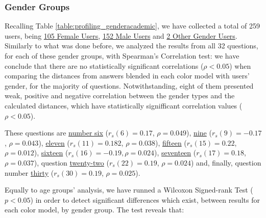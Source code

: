 \subsubsection{Gender Groups}
\label{subsubsec:demo_age}
%
Recalling Table \ref{table:profiling_genderacademic}, we have collected a total of 259 users, being \ul{105 Female Users}, \ul{152 Male Users} and \ul{2 Other Gender Users}. Similarly to what was done before, we analyzed the results from
all 32 questions, for each of these gender groups, with Spearman's Correlation test: we have conclude that there are no statistically significant correlations ($\rho < 0.05$) when comparing the distances from answers blended in each color model with users' gender, for the majority of questions.
Notwithstanding, eight of them presented weak, positive and negative correlation between the gender types and the calculated distances, which have statistically signifficant correlation values ($\rho < 0.05$). \par
%
These questions are \ul{number six} ($r_s(6) = 0.17$, $\rho = 0.049$), \ul{nine} ($r_s(9) = -0.17$, $\rho = 0.043$), \ul{eleven} ($r_s(11) = 0.182$, $\rho = 0.038$), \ul{fifteen} ($r_s(15) = 0.22$, $\rho = 0.012$), \ul{sixteen} ($r_s(16) = -0.19, \rho = 0.024$), \ul{seventeen}
($r_s(17) = 0.18$, $\rho = 0.037$), question \ul{twenty-two} ($r_s(22) = 0.19$, $\rho = 0.024$) and, finally, question number \ul{thirty} ($r_s(30) = 0.19$, $\rho = 0.025$). \par
%
Equally to age groups' analysis, we have runned a Wilcoxon Signed-rank Test ($p < 0.05$) in order to detect significant differences which exist, between results for each color model, by gender group. The test reveals that:
%
